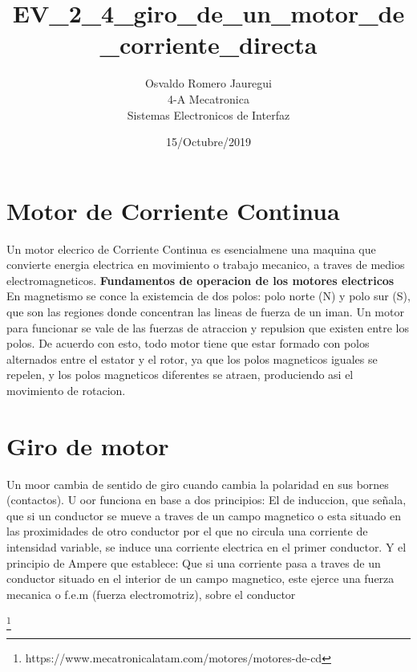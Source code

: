 \documentclass[11pt]{article}
\title{\textbf{EV\_2\_4\_giro\_de\_un\_motor\_de\_corriente\_directa}}
\author{Osvaldo Romero Jauregui\\
		4-A Mecatronica\\
		Sistemas Electronicos de Interfaz}
\date{15/Octubre/2019}
\begin{document}
\maketitle

\section{Motor de Corriente Continua}
Un motor elecrico de Corriente Continua es esencialmene una maquina que convierte energia electrica en movimiento o trabajo mecanico, a traves de medios electromagneticos.
\textbf{Fundamentos de operacion de los motores electricos}
En magnetismo se conce la existemcia de dos polos: polo norte (N) y polo sur (S), que son las regiones donde concentran las lineas de fuerza de un iman. Un motor para funcionar se vale de las fuerzas de atraccion y repulsion que existen entre los polos. De acuerdo con esto, todo motor tiene que estar formado con polos alternados entre el estator y el rotor, ya que los polos magneticos iguales se repelen, y los polos magneticos diferentes se atraen, produciendo asi el movimiento de rotacion.

\section{Giro de motor}
Un moor cambia de sentido de giro cuando cambia la polaridad en sus bornes (contactos).
U  oor funciona en base a dos principios: El de induccion, que señala, que si un conductor se mueve a traves de un campo magnetico o esta situado en las proximidades de otro conductor por el que no circula una corriente de intensidad variable, se induce una corriente electrica en el primer conductor. Y el principio de Ampere que establece: Que si una corriente pasa a traves de un conductor situado en el interior de un campo magnetico, este ejerce una fuerza mecanica o f.e.m (fuerza electromotriz), sobre el conductor

\footnote{https://www.mecatronicalatam.com/motores/motores-de-cd}
\end{document}
